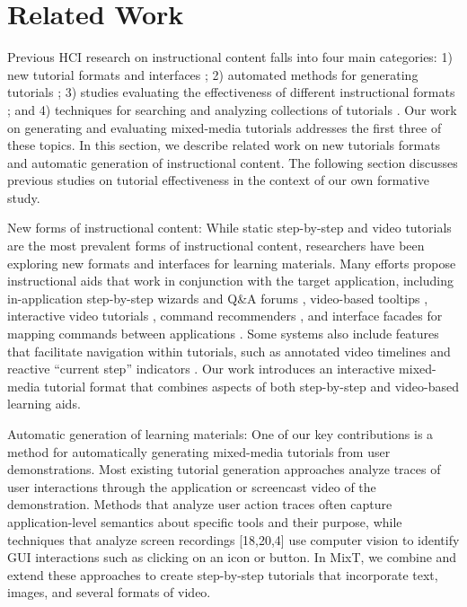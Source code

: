 \section{Related Work}

Previous HCI research on instructional content falls into four main categories:
%
1) new tutorial formats and interfaces \cite{Bergman:2005:DocWizards,Fernquist:2011:SRE:2047196.2047245,Grossman:2010wr,Kelleher:2005:STD:1054972.1055047,Matejka:2009:CCR:1622176.1622214,Matejka:2011:IIQ:2047196.2047218,Pongnumkul:2011ju};
%
2) automated methods for generating tutorials \cite{Denning:2011fy,Grabler:2009jj,Grossman:2010jz,Pongnumkul:2011ju};
%
3) studies evaluating the effectiveness of different instructional formats \cite{Grabler:2009jj,Grossman:2010wr,Harrison:1995uh,Palmiter:1991:ADV:107792.107797,Palmiter:1993:ADL:1461829.1461830};
%
and 4) techniques for searching and analyzing collections of tutorials \cite{Ekstrand:2011:SSL:2047196.2047220,Kong:2012:DTR:2207676.2208549}. Our work on generating and evaluating mixed-media tutorials addresses the first three of these topics. In this section, we describe related work on new tutorials formats and automatic generation of instructional content. The following section discusses previous studies on tutorial effectiveness in the context of our own formative study.

New forms of instructional content: While static step-by-step and video tutorials are the most prevalent forms of instructional content, researchers have been exploring new formats and interfaces for learning materials. Many efforts propose instructional aids that work in conjunction with the target application, including in-application step-by-step wizards \cite{Bergman:2005:DocWizards:a,Kelleher:2005:STD:1054972.1055047,Fernquist:2011:SRE:2047196.2047245} and Q\&A forums \cite{Matejka:2011:IIQ:2047196.2047218}, video-based tooltips \cite{Grossman:2010wr}, interactive video tutorials \cite{Pongnumkul:2011ju}, command recommenders \cite{Matejka:2009:CCR:1622176.1622214}, and interface facades for mapping commands between applications \cite{Ramesh:2011:STU:2047196.2047212}. Some systems also include features that facilitate navigation within tutorials, such as annotated video timelines \cite{Grossman:2010jz,Pongnumkul:2011ju} and reactive ``current step'' indicators \cite{Fernquist:2011:SRE:2047196.2047245}. Our work introduces an interactive mixed-media tutorial format that combines aspects of both step-by-step and video-based learning aids.

Automatic generation of learning materials: One of our key contributions is a method for automatically generating mixed-media tutorials from user demonstrations. Most existing tutorial generation approaches analyze traces of user interactions through the application or screencast video of the demonstration. Methods that analyze user action traces \cite{Grabler:2009jj,Denning:2011fy,Grossman:2010jz} often capture application-level semantics about specific tools and their purpose, while techniques that analyze screen recordings [18,20,4] use computer vision to identify GUI interactions such as clicking on an icon or button. In MixT, we combine and extend these approaches to create step-by-step tutorials that incorporate text, images, and several formats of video.
